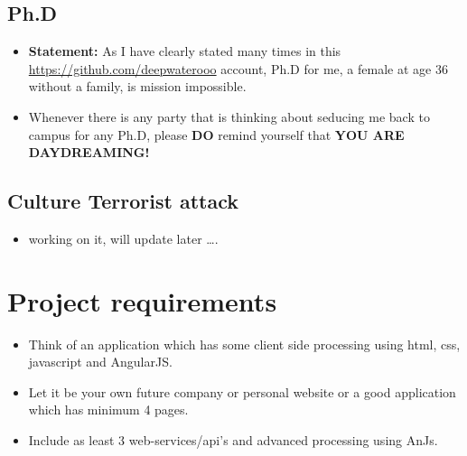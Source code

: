\documentclass[9pt,b5paper]{article}
\begin{document}
\subsection{Ph.D}
\label{sec-12-4}
\begin{itemize}
\item \textbf{Statement:} As I have clearly stated many times in this \url{https://github.com/deepwaterooo} account, Ph.D for me, a female at age 36 without a family, is mission impossible.
\item Whenever there is any party that is thinking about seducing me back to campus for any Ph.D, please \textbf{DO} remind yourself that \textbf{YOU ARE DAYDREAMING!}
\end{itemize}
\subsection{Culture Terrorist attack}
\label{sec-12-5}
\begin{itemize}
\item working on it, will update later \ldots{}.
\end{itemize}


\section{Project requirements}
\label{sec-13}
\begin{itemize}
\item Think of an application which has some client side processing using html, css, javascript and AngularJS.
\item Let it be your own future company or personal website or a good application which has minimum 4 pages.
\item Include as least 3 web-services/api's and advanced processing using AnJs.
\end{itemize}
\end{document}
